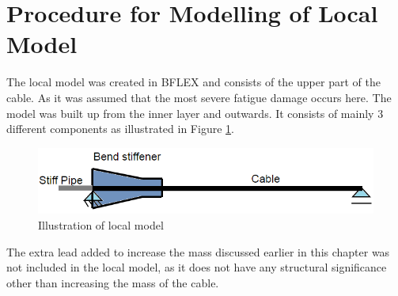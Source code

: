 \section{Procedure for Modelling of Local Model}
The local model was created in BFLEX and consists of the upper part of the cable. As it was assumed that the most severe fatigue damage occurs here.  The model was built up from the inner layer and outwards. It consists of mainly 3 different components as illustrated in Figure \ref{fig:localmod}.
\begin{figure}[H]
\centering
\includegraphics[scale=0.7]{figures/localmod.png}
\caption [$\; \:$Illustration of local model]{Illustration of local model}
 \label{fig:localmod}
\end{figure}
The extra lead added to increase the mass discussed earlier in this chapter was not included in the local model, as it does not have any structural significance other than increasing the mass of the cable.\newline
\newline
